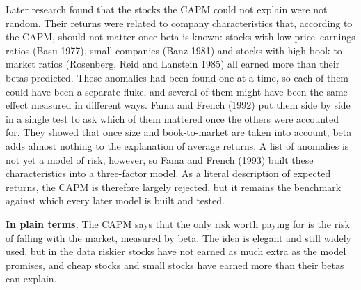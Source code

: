 Later research found that the stocks the CAPM could not explain were not random. Their returns were related to company characteristics that, according to the CAPM, should not matter once beta is known: stocks with low price--earnings ratios (Basu 1977), small companies (Banz 1981) and stocks with high book-to-market ratios (Rosenberg, Reid and Lanstein 1985) all earned more than their betas predicted. These anomalies had been found one at a time, so each of them could have been a separate fluke, and several of them might have been the same effect measured in different ways. Fama and French (1992) put them side by side in a single test to ask which of them mattered once the others were accounted for. They showed that once size and book-to-market are taken into account, beta adds almost nothing to the explanation of average returns. A list of anomalies is not yet a model of risk, however, so Fama and French (1993) built these characteristics into a three-factor model. As a literal description of expected returns, the CAPM is therefore largely rejected, but it remains the benchmark against which every later model is built and tested.

\noindent\textbf{In plain terms.} The CAPM says that the only risk worth paying for is the risk of falling with the market, measured by beta. The idea is elegant and still widely used, but in the data riskier stocks have not earned as much extra as the model promises, and cheap stocks and small stocks have earned more than their betas can explain.


